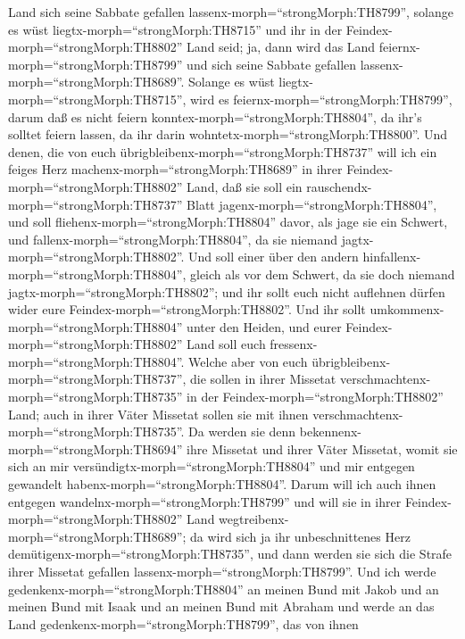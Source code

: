 Land sich seine Sabbate gefallen lassenx-morph=``strongMorph:TH8799'',
solange es wüst liegtx-morph=``strongMorph:TH8715'' und ihr in der
Feindex-morph=``strongMorph:TH8802'' Land seid; ja, dann wird das Land
feiernx-morph=``strongMorph:TH8799'' und sich seine Sabbate gefallen
lassenx-morph=``strongMorph:TH8689''.  Solange es wüst
liegtx-morph=``strongMorph:TH8715'', wird es
feiernx-morph=``strongMorph:TH8799'', darum daß es nicht feiern
konntex-morph=``strongMorph:TH8804'', da ihr's solltet feiern lassen, da
ihr darin wohntetx-morph=``strongMorph:TH8800''.  Und
denen, die von euch übrigbleibenx-morph=``strongMorph:TH8737'' will ich
ein feiges Herz machenx-morph=``strongMorph:TH8689'' in ihrer
Feindex-morph=``strongMorph:TH8802'' Land, daß sie soll ein
rauschendx-morph=``strongMorph:TH8737'' Blatt
jagenx-morph=``strongMorph:TH8804'', und soll
fliehenx-morph=``strongMorph:TH8804'' davor, als jage sie ein Schwert,
und fallenx-morph=``strongMorph:TH8804'', da sie niemand
jagtx-morph=``strongMorph:TH8802''.  Und soll einer über
den andern hinfallenx-morph=``strongMorph:TH8804'', gleich als vor dem
Schwert, da sie doch niemand jagtx-morph=``strongMorph:TH8802''; und ihr
sollt euch nicht auflehnen dürfen wider eure
Feindex-morph=``strongMorph:TH8802''.  Und ihr sollt
umkommenx-morph=``strongMorph:TH8804'' unter den Heiden, und eurer
Feindex-morph=``strongMorph:TH8802'' Land soll euch
fressenx-morph=``strongMorph:TH8804''.  Welche aber von
euch übrigbleibenx-morph=``strongMorph:TH8737'', die sollen in ihrer
Missetat verschmachtenx-morph=``strongMorph:TH8735'' in der
Feindex-morph=``strongMorph:TH8802'' Land; auch in ihrer Väter Missetat
sollen sie mit ihnen verschmachtenx-morph=``strongMorph:TH8735''.
 Da werden sie denn bekennenx-morph=``strongMorph:TH8694''
ihre Missetat und ihrer Väter Missetat, womit sie sich an mir
versündigtx-morph=``strongMorph:TH8804'' und mir entgegen gewandelt
habenx-morph=``strongMorph:TH8804''.  Darum will ich auch
ihnen entgegen wandelnx-morph=``strongMorph:TH8799'' und will sie in
ihrer Feindex-morph=``strongMorph:TH8802'' Land
wegtreibenx-morph=``strongMorph:TH8689''; da wird sich ja ihr
unbeschnittenes Herz demütigenx-morph=``strongMorph:TH8735'', und dann
werden sie sich die Strafe ihrer Missetat gefallen
lassenx-morph=``strongMorph:TH8799''.  Und ich werde
gedenkenx-morph=``strongMorph:TH8804'' an meinen Bund mit Jakob und an
meinen Bund mit Isaak und an meinen Bund mit Abraham und werde an das
Land gedenkenx-morph=``strongMorph:TH8799'',  das von ihnen
